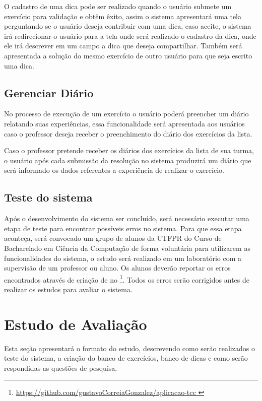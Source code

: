 O cadastro de uma dica pode ser realizado quando o usuário submete um exercício para validação e obtêm êxito, assim o sistema apresentará uma tela perguntando se o usuário deseja contribuir com uma dica, caso aceite, o sistema irá redirecionar o usuário para a tela onde será realizado o cadastro da dica, onde ele irá descrever em um campo a dica que deseja compartilhar. Também será apresentada a solução do mesmo exercício de outro usuário para que seja escrito uma dica. 

\subsection{Gerenciar Diário}

No processo de execução de um exercício o usuário poderá preencher um diário relatando suas experiências, essa funcionalidade será apresentada aos usuários caso o professor deseja receber o preenchimento do diário dos exercícios da lista. 

Caso o professor pretende receber os diários dos exercícios da lista de sua turma, o usuário após cada submissão da resolução no sistema produzirá um diário que será informado os dados referentes a experiência de realizar o exercício. 

\subsection{Teste do sistema}

Após o desenvolvimento do sistema ser concluído, será necessário executar uma etapa de teste para encontrar possíveis erros no sistema. Para que essa etapa aconteça, será convocado um grupo de alunos da UTFPR do Curso de Bacharelado em Ciência da Computação de forma voluntária para utilizarem as funcionalidades do sistema, o estudo será realizado em um laboratório com a supervisão de um professor ou aluno. Os alunos deverão reportar os erros encontrados através de criação de  no  \footnote{\url{https://github.com/gustavoCorreiaGonzalez/aplicacao-tcc }}. Todos os erros serão corrigidos antes de realizar os estudos para avaliar o sistema.

\section{Estudo de Avaliação}

Esta seção apresentará o formato do estudo, descrevendo como serão realizados o teste do sistema, a criação do banco de exercícios, banco de dicas e como serão respondidas as questões de pesquisa.

